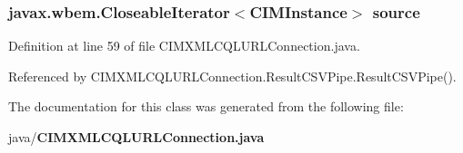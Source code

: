 \subsubsection[{source}]{\setlength{\rightskip}{0pt plus 5cm}javax.\+wbem.\+Closeable\+Iterator$<$C\+I\+M\+Instance$>$ source\hspace{0.3cm}{\ttfamily [protected]}}\label{classorg_1_1smallfoot_1_1parser_1_1cimcql_1_1CIMXMLCQLURLConnection_1_1ResultCSVPipe_aba69451974e3a12eee61d115c7a023d1}


Definition at line 59 of file C\+I\+M\+X\+M\+L\+C\+Q\+L\+U\+R\+L\+Connection.\+java.



Referenced by C\+I\+M\+X\+M\+L\+C\+Q\+L\+U\+R\+L\+Connection.\+Result\+C\+S\+V\+Pipe.\+Result\+C\+S\+V\+Pipe().



The documentation for this class was generated from the following file\+:\begin{DoxyCompactItemize}
\item 
java/{\bf C\+I\+M\+X\+M\+L\+C\+Q\+L\+U\+R\+L\+Connection.\+java}\end{DoxyCompactItemize}

